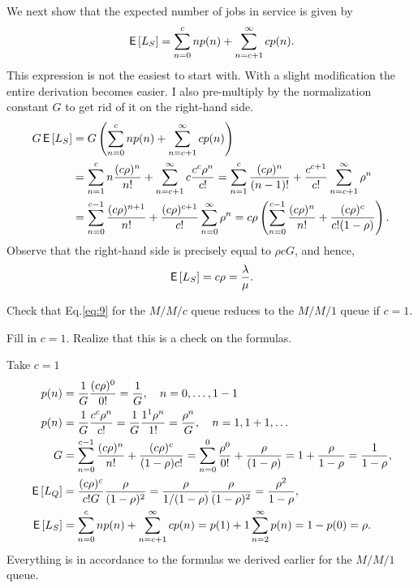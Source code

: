 \begin{exercise}
\begin{solution}
We next show that the expected number of jobs in service is given
by
    \begin{equation*}
      \,\mathsf{E}\left[L_S\right] = \sum_{n=0}^{c} n p(n) + \sum_{n=c+1}^{\infty} c p(n).
    \end{equation*}
    This expression is not the easiest to start with. With a slight
    modification the entire derivation becomes easier. I also pre-multiply by the normalization constant $G$ to get rid of it on the right-hand side. 
    \begin{align*}
      G \,\mathsf{E}\left[L_S\right]
&= G \left( \sum_{n=0}^{c} n p(n) + \sum_{n=c+1}^{\infty} c p(n) \right) \\
&= \sum_{n=1}^{c} n \frac{(c\rho)^n}{n!}  + \sum_{n=c+1}^{\infty} c \frac{c^c\rho^n}{c!} 
= \sum_{n=1}^{c} \frac{(c\rho)^n}{(n-1)!}  + \frac{c^{c+1}}{c!}\sum_{n=c+1}^{\infty} \rho^n\\
&= \sum_{n=0}^{c-1} \frac{(c\rho)^{n+1}}{n!}  + \frac{(c\rho)^{c+1}}{c!}\sum_{n=0}^{\infty} \rho^n
= c\rho \left(\sum_{n=0}^{c-1} \frac{(c\rho)^n}{n!}  + \frac{(c\rho)^{c}}{c!(1-\rho)}\right).
    \end{align*}
Observe that the right-hand side is precisely equal to $\rho c G$, and hence,
\begin{equation*}
  \,\mathsf{E}\left[L_S\right] = c\rho = \frac\lambda\mu.
\end{equation*}
\end{solution}
\end{exercise}

\begin{exercise}[\faFlask]
  Check that  Eq.\eqref{eq:9} for the $M/M/c$ queue reduces to the $M/M/1$ queue if $c=1$.
  \begin{hint}
Fill in $c=1$. Realize that this is a check on the formulas.
  \end{hint}
  \begin{solution}
Take $c=1$
\begin{subequations}
 \begin{align}
p(n) &= \frac{1}G \frac{(c\rho)^0}{0!}=\frac1 G, \quad n=0,\ldots, 1-1 \\
p(n) &= \frac{1}G \frac{c^c\rho^n}{c!} = \frac{1}G \frac{1^1\rho^n}{1!} =\frac{\rho^n}G , \quad n=1,1+1, \ldots \\
G &=\sum_{n=0}^{c-1} \frac{(c\rho)^n}{n!} + \frac{(c\rho)^c}{(1-\rho)c!}
=\sum_{n=0}^{0} \frac{\rho^0}{0!} + \frac{\rho}{(1-\rho)} = 1 + \frac{\rho}{1-\rho} = \frac1{1-\rho},
\\
\,\mathsf{E}\left[L_Q\right] &= \frac{(c\rho)^c}{c! G}\frac{\rho}{(1-\rho)^2} = \frac{\rho}{1/(1-\rho)}\frac{\rho}{(1-\rho)^2} = \frac{\rho^2}{1-\rho}, \\
\,\mathsf{E}\left[L_S\right] &= \sum_{n=0}^{c}n p(n) + \sum_{n=c+1}^\infty c p(n) = p(1) + 1 \sum_{n=2}^\infty p(n) = 1- p(0) = \rho.
\end{align}
\end{subequations}
Everything is in accordance to the formulas we derived earlier for the $M/M/1$ queue.    
  \end{solution}
\end{exercise}


